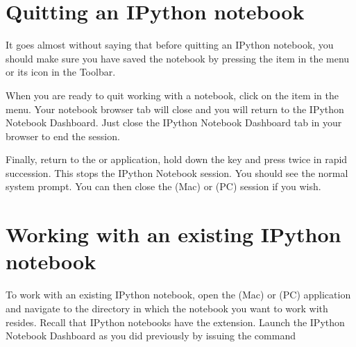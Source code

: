 \documentclass[letterpaper,10pt,english]{sphinxmanual}
\begin{document}
\section{Quitting an IPython notebook}
\label{\detokenize{apdx2/apdx2_ipynb:quitting-an-ipython-notebook}}
\sphinxAtStartPar
It goes almost without saying that before quitting an IPython notebook, you should make sure you have saved the notebook by pressing the  item in the  menu or its icon in the Toolbar.

\sphinxAtStartPar
When you are ready to quit working with a notebook, click on the  item in the  menu.  Your notebook browser tab will close and you will return to the IPython Notebook Dashboard.  Just close the IPython Notebook Dashboard tab in your browser to end the session.

\sphinxAtStartPar
Finally, return to the  or  application, hold down the  key and press  twice in rapid succession.  This stops the IPython Notebook session.  You should see the normal system prompt.  You can then close the  (Mac) or  (PC) session if you wish.


\section{Working with an existing IPython notebook}
\label{\detokenize{apdx2/apdx2_ipynb:working-with-an-existing-ipython-notebook}}
\sphinxAtStartPar
To work with an existing IPython notebook, open the  (Mac) or  (PC) application and navigate to the directory in which the notebook you want to work with resides.  Recall that IPython notebooks have the  extension.  Launch the IPython Notebook Dashboard as you did previously by issuing the command
\begin{quote}

\begin{sphinxVerbatim}[commandchars=\\\{\}]
   
\end{sphinxVerbatim}
\end{quote}
\end{document}
